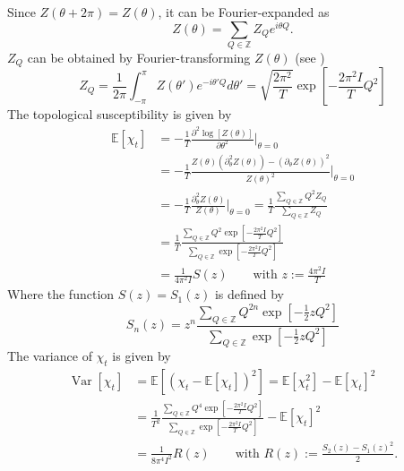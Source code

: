 \documentclass[11pt]{article}
\begin{document}
Since $Z(\theta+2\pi)=Z(\theta)$, it can be Fourier-expanded as
\begin{equation}
  Z(\theta)=\sum_{Q\in\mathbb{Z}} Z_Q e^{i\theta Q}.
\end{equation}
$Z_Q$ can be obtained by Fourier-transforming $Z(\theta)$ (see \cite{Bietenholz1997})
\begin{equation}
  Z_Q = \frac{1}{2\pi}\int_{-\pi}^{\pi} Z(\theta')e^{-i\theta'Q}d\theta'
  = \sqrt{\frac{2\pi^2}{T}}\exp\left[-\frac{2\pi^2I}{T}Q^2\right]
\end{equation}
The topological susceptibility is given by
\begin{equation}
  \begin{aligned}
    \mathbb{E}[\chi_t] &= -\frac{1}{T}\frac{\partial^2\log[Z(\theta)]}{\partial\theta^2}\Big\vert_{\theta=0}\\
    &= -\frac{1}{T}\frac{Z(\theta)(\partial^2_\theta Z(\theta))-(\partial_\theta Z(\theta))^2}{Z(\theta)^2}\Big\vert_{\theta=0}\\
    &= -\frac{1}{T}\frac{\partial^2_\theta Z(\theta)}{Z(\theta)}\Big\vert_{\theta=0}
    = \frac{1}{T}\frac{\sum_{Q\in\mathbb{Z}} Q^2 Z_Q}{\sum_{Q\in\mathbb{Z}}Z_Q}\\
    &= \frac{1}{T}\frac{\sum_{Q\in\mathbb{Z}} Q^2 \exp\left[-\frac{2\pi^2I}{T}Q^2\right]}{\sum_{Q\in\mathbb{Z}}\exp\left[-\frac{2\pi^2I}{T}Q^2\right]}\\
    &= \frac{1}{4\pi^2 I} S(z)\qquad\text{with $z:=\frac{4\pi^2 I}{T}$}
      \end{aligned}
\end{equation}
Where the function $S(z)=S_1(z)$ is defined by
\begin{equation}
  S_n(z) = z^n \frac{\sum_{Q\in\mathbb{Z}}Q^{2n} \exp\left[-\frac{1}{2}zQ^2\right]}{\sum_{Q\in\mathbb{Z}}\exp\left[-\frac{1}{2}zQ^2\right]}\label{eqn:Sz}
\end{equation}
The variance of $\chi_t$ is given by
\begin{equation}
  \begin{aligned}
    \operatorname{Var}[\chi_t] &= \mathbb{E}\left[(\chi_t-\mathbb{E}[\chi_t])^2\right]=\mathbb{E}[\chi_t^2]-\mathbb{E}[\chi_t]^2\\
    &= \frac{1}{T^2}\frac{\sum_{Q\in\mathbb{Z}}Q^4\exp\left[-\frac{2\pi^2I}{T}Q^2\right]}{\sum_{Q\in\mathbb{Z}}\exp[-\frac{2\pi^2I}{T}Q^2]}-\mathbb{E}[\chi_t]^2\\
    &= \frac{1}{8\pi^4 I^2} R(z) \qquad\text{with $R(z):=\frac{S_2(z)-S_1(z)^2}{2}$.}
  \end{aligned}
\end{equation}
\end{document}
